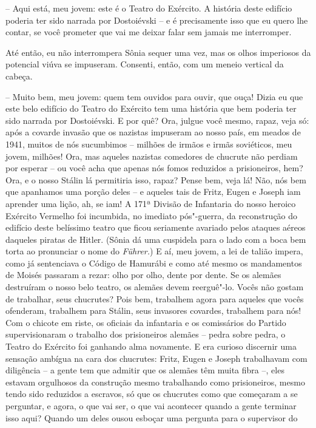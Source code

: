 -- Aqui está, meu jovem: este é o Teatro do Exército. A história deste
edifício poderia ter sido narrada por Dostoiévski -- e é precisamente
isso que eu quero lhe contar, se você prometer que vai me deixar falar
sem jamais me interromper.

Até então, eu não interrompera Sônia sequer uma vez, mas os olhos
imperiosos da potencial viúva se impuseram. Consenti, então, com um
meneio vertical da cabeça.

-- Muito bem, meu jovem: quem tem ouvidos para ouvir, que ouça! Dizia eu
que este belo edifício do Teatro do Exército tem uma história que bem
poderia ter sido narrada por Dostoiévski. E por quê? Ora, julgue você
mesmo, rapaz, veja só: após a covarde invasão que os nazistas impuseram
ao nosso país, em meados de 1941, muitos de nós sucumbimos -- milhões de
irmãos e irmãs soviéticos, meu jovem, milhões! Ora, mas aqueles nazistas
comedores de chucrute não perdiam por esperar -- ou você acha que apenas
nós fomos reduzidos a prisioneiros, hem? Ora, e o nosso Stálin lá
permitiria isso, rapaz? Pense bem, veja lá! Não, nós bem que apanhamos
uma porção deles -- e aqueles tais de Fritz, Eugen e Joseph iam aprender
uma lição, ah, se iam! A 171ª Divisão de Infantaria do nosso heroico
Exército Vermelho foi incumbida, no imediato pós"-guerra, da reconstrução
do edifício deste belíssimo teatro que ficou seriamente avariado pelos
ataques aéreos daqueles piratas de Hitler. (Sônia dá uma cuspidela para
o lado com a boca bem torta ao pronunciar o nome do \emph{Führer.}) E
aí, meu jovem, a lei de talião impera, como já sentenciava o Código de
Hamurábi e como até mesmo os mandamentos de Moisés passaram a rezar:
olho por olho, dente por dente. Se os alemães destruíram o nosso belo
teatro, os alemães devem reerguê"-lo. Vocês não gostam de trabalhar, seus
chucrutes? Pois bem, trabalhem agora para aqueles que vocês ofenderam,
trabalhem para Stálin, seus invasores covardes, trabalhem para nós! Com
o chicote em riste, os oficiais da infantaria e os comissários do
Partido supervisionaram o trabalho dos prisioneiros alemães -- pedra
sobre pedra, o Teatro do Exército foi ganhando alma novamente. E era
curioso discernir uma sensação ambígua na cara dos chucrutes: Fritz,
Eugen e Joseph trabalhavam com diligência -- a gente tem que admitir que
os alemães têm muita fibra --, eles estavam orgulhosos da construção
mesmo trabalhando como prisioneiros, mesmo tendo sido reduzidos a
escravos, só que os chucrutes como que começaram a se perguntar, e
agora, o que vai ser, o que vai acontecer quando a gente terminar isso
aqui? Quando um deles ousou esboçar uma pergunta para o supervisor do
